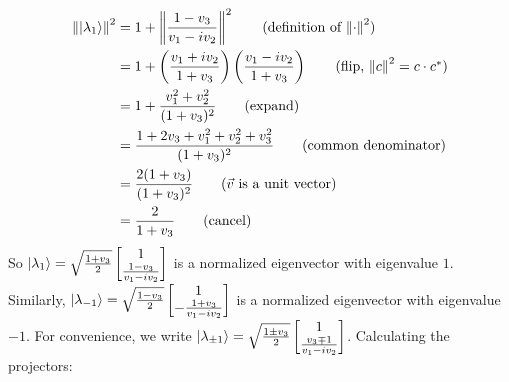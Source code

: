 \begin{align*}\norm{\ket{\lambda_1}}^2 &= 1+\norm{\frac{1-v_3}{v_1-iv_2}}^2 \tag{definition of $\norm{\cdot}^2$}\\
    &= 1+\left(\frac{v_1+iv_2}{1+v_3}\right)\left(\frac{v_1-iv_2}{1+v_3}\right) \tag{flip, $\norm{c}^2=c\cdot c^*$} \\
    &= 1+\frac{v_1^2+v_2^2}{(1+v_3)^2} \tag{expand} \\
    &= \frac{1+2v_3+v_1^2+v_2^2+v_3^2}{(1+v_3)^2} \tag{common denominator} \\
    &= \frac{2(1+v_3)}{(1+v_3)^2} \tag{$\vec{v}$ is a unit vector} \\
    &=\frac{2}{1+v_3} \tag{cancel}
\end{align*}
So $\ket{\lambda_1} = \sqrt{ \frac{1+v_3}{2 }} \begin{bmatrix}
1 \\
\frac{1-v_3}{v_1 - iv_2}
\end{bmatrix} $ is a normalized eigenvector with eigenvalue $1$.  Similarly, $\ket{\lambda_{-1}} = \sqrt{ \frac{1-v_3}{2 }} \begin{bmatrix}
    1 \\
    - \frac{1+v_3}{v_1 - iv_2}
\end{bmatrix} $ is a normalized eigenvector with eigenvalue $-1$.  For convenience, we write $\ket{\lambda_{\pm1}} = \sqrt{\frac{1\pm v_3}{2}}\begin{bmatrix}1 \\ \frac{v_3\mp 1}{v_1-iv_2}\end{bmatrix}$.  Calculating the projectors:

